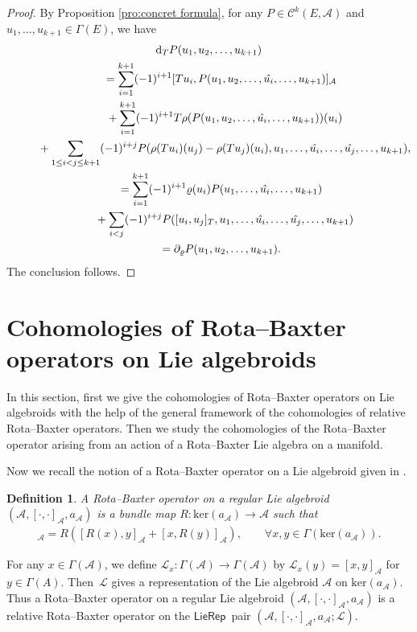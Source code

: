 \documentclass[pdftex]{sigma}%
\numberwithin{equation}{section}
\newtheorem{defi}[thm]{Definition}
\newcommand{\huaA}{\mathcal{A}}
\newcommand{\huaC}{\mathcal{C}}
\newcommand{\huaL}{\mathcal{L}}
\newcommand{\dM}{\mathrm{d}}
\newcommand{\Ker}{\mathrm{ker}}
\newcommand{\LP}{$\mathsf{LieRep}$~}
\begin{document}
\begin{proof}
By Proposition \ref{pro:concret formula}, for any $P\in\huaC^k(E,\huaA)$ and $u_1,\dots,u_{k+1}\in\Gamma{(E)}$, we have
\begin{gather*}
\dM_{T}P(u_1,u_2,\dots,u_{k+1})
\\ \qquad
{}=\sum_{i=1}^{k+1}(-1)^{i+1}[Tu_i,P(u_1,u_2,\dots,\hat{u_i},\dots,u_{k+1})]_{\huaA}
\\ \qquad\hphantom{=}
{}+\sum_{i=1}^{k+1}(-1)^{i+1}T\rho(P(u_1,u_2,\dots,\hat{u_i},\dots,u_{k+1}))(u_i)
\\ \qquad\hphantom{=}
{}+\sum_{1\leq i<j\leq {k+1}}(-1)^{i+j}P(\rho(Tu_i)(u_j)-\rho(Tu_j)(u_i),u_1,\dots,\hat{u_i},\dots,\hat{u_j},\dots,u_{k+1}),
\\ \qquad
{}=\sum_{i=1}^{k+1}(-1)^{i+1}\varrho(u_i)P(u_1,\dots,\hat{u_i},\dots,u_{k+1})
\\ \qquad\hphantom{=}
{}+\sum_{i<j}(-1)^{i+j}P([u_i,u_j]_T,u_1,\dots,\hat{u_i},\dots,\hat{u_j},\dots,u_{k+1})
\\ \qquad
{}=\partial_{\varrho}P(u_1,u_2,\dots,u_{k+1}).
\end{gather*}
The conclusion follows.
\end{proof}


\section{Cohomologies of Rota--Baxter operators on Lie algebroids}\label{sce:Cohomology RB}
In this section, first we give the cohomologies of Rota--Baxter operators on Lie algebroids with the help of the general framework of the cohomologies of relative Rota--Baxter operators. Then we study the cohomologies of the Rota--Baxter operator arising from an action of a Rota--Baxter Lie algebra on a manifold.

 Now we recall the notion of a Rota--Baxter operator on a Lie algebroid given in \cite{Rota--Baxter_Lie_algebroid}.
\begin{defi}
 A {\it Rota--Baxter operator} on a regular Lie algebroid $(\huaA,[\cdot,\cdot]_\huaA,a_\huaA)$ is a bundle map $R\colon \Ker(a_\huaA)\to \huaA$ such that
 \begin{gather*}%
 [R(x),R(y)]_\huaA=R([R(x),y]_\huaA+[x,R(y)]_\huaA),\qquad \forall x,y\in\Gamma(\Ker(a_\huaA)).
 \end{gather*}
\end{defi}

For any $x\in\Gamma(\huaA)$, we define $\huaL_x\colon \Gamma(\huaA)\longrightarrow\Gamma(\huaA)$ by $\huaL_x(y)=[x,y]_\huaA$ for $y\in\Gamma(A)$. Then~$\huaL$ gives a representation of the Lie algebroid $\huaA$ on $ \Ker(a_\huaA)$. Thus a Rota--Baxter operator on a regular Lie algebroid $(\huaA,[\cdot,\cdot]_\huaA,a_\huaA)$ is a relative Rota--Baxter operator on the \LP pair $(\huaA,[\cdot,\cdot]_\huaA,a_\huaA;\huaL)$.
\end{document}
